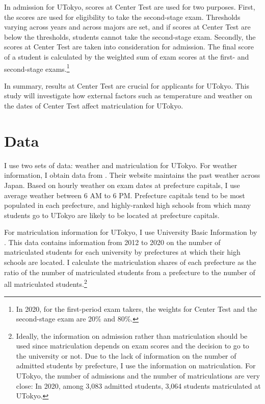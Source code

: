 \documentclass[12pt,letterpaper]{article}
\begin{document}
In admission for UTokyo, scores at Center Test are used for two purposes.
First, the scores are used for eligibility to take the second-stage exam.
Thresholds varying across years and across majors are set, and if scores at Center Test are below the thresholds, students cannot take the second-stage exam.
Secondly, the scores at Center Test are taken into consideration for admission.
The final score of a student is calculated by the weighted sum of exam scores at the first- and second-stage exams.\footnote{
  In 2020, for the first-period exam takers, the weights for Center Test and the second-stage exam are 20\% and 80\%.
}

In summary, results at Center Test are crucial for applicants for UTokyo.
This study will investigate how external factors such as temperature and weather on the dates of Center Test affect matriculation for UTokyo.

\section{Data}\label{sec:data}

I use two sets of data: weather and matriculation for UTokyo.
For weather information, I obtain data from .
Their website maintains the past weather across Japan.
Based on hourly weather on exam dates at prefecture capitals, I use average weather between 6 AM to 6 PM.
Prefecture capitals tend to be most populated in each prefecture, and highly-ranked high schools from which many students go to UTokyo are likely to be located at prefecture capitals.

For matriculation information for UTokyo, I use University Basic Information by .
This data contains information from 2012 to 2020 on the number of matriculated students for each university by prefectures at which their high schools are located.
I calculate the matriculation shares of each prefecture as the ratio of the number of matriculated students from a prefecture to the number of all matriculated students.\footnote{
  Ideally, the information on admission rather than matriculation should be used since matriculation depends on exam scores and the decision to go to the university or not.
  Due to the lack of information on the number of admitted students by prefecture, I use the information on matriculation.
  For UTokyo, the number of admissions and the number of matriculations are very close:
  In 2020, among 3,083 admitted students, 3,064 students matriculated at UTokyo.
}
\end{document}
